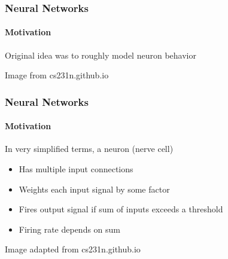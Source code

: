 \documentclass[xetex,professionalfont]{beamer}
\renewcommand\emph[1]{\textcolor{tuwcvl_cvl_blue}{#1}}
\begin{document}
\begin{frame}
\frametitle{Neural Networks}
\framesubtitle{Motivation}

Original idea was to roughly model neuron behavior

\bigskip

\begin{center}
    {\centering Image from cs231n.github.io}
\end{center}

\end{frame}


\begin{frame}
\frametitle{Neural Networks}
\framesubtitle{Motivation}

In very simplified terms, a \emph{neuron} (nerve cell)
\begin{itemize}
    \item Has multiple input connections
    \item Weights each input signal by some factor
    \item Fires output signal if sum of inputs exceeds a threshold %
    \item Firing rate depends on sum 
\end{itemize}

\smallskip

\begin{center}
    {\centering Image adapted from cs231n.github.io}
\end{center}

\end{frame}
\end{document}
